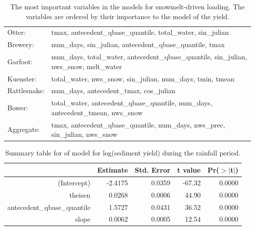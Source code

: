 \documentclass[10pt]{article}
\begin{document}
\begin{table}[h!]
\begin{center}
\begin{tabular}{ll}
        \hspace{5mm} Otter: & tmax, antecedent\_qbase\_quantile, total\_water, sin\_julian\\
        \hspace{5mm} Brewery: & num\_days, sin\_julian, antecedent\_qbase\_quantile, tmax\\
        \hspace{5mm} Garfoot: & num\_days, total\_water, antecedent\_qbase\_quantile, sin\_julian, nws\_snow, melt\_water\\
        \hspace{5mm} Kuenster: & total\_water, nws\_snow, sin\_julian, num\_days, tmin, tmean\\
        \hspace{5mm} Rattlesnake: & num\_days, antecedent\_tmax, cos\_julian\\
        \hspace{5mm} Bower: & total\_water, antecedent\_qbase\_quantile, num\_days, antecedent\_tmean, nws\_snow\\
        \hspace{5mm} Aggregate: & tmax, antecedent\_qbase\_quantile, num\_days, nws\_prec, sin\_julian, nws\_snow\\
    \end{tabular}
    \caption{The most important variables in the models for snowmelt-driven loading. The variables are ordered by their importance to the model of the yield. \label{snow_predictor_list}}
    \end{center}
\end{table}


\begin{table}[ht]
\begin{center}
\begin{tabular}{rrrrr}
  \hline
 & Estimate & Std. Error & t value & Pr($>$$|$t$|$) \\ 
  \hline
(Intercept) & -2.4175 & 0.0359 & -67.32 & 0.0000 \\ 
  theisen & 0.0268 & 0.0006 & 44.90 & 0.0000 \\ 
  antecedent\_qbase\_quantile & 1.5727 & 0.0431 & 36.52 & 0.0000 \\ 
  slope & 0.0062 & 0.0005 & 12.54 & 0.0000 \\ 
   \hline
\end{tabular}
\caption{Summary table for of model for log(sediment yield) during the rainfall period.}
\end{center}
\end{table}
\end{document}
